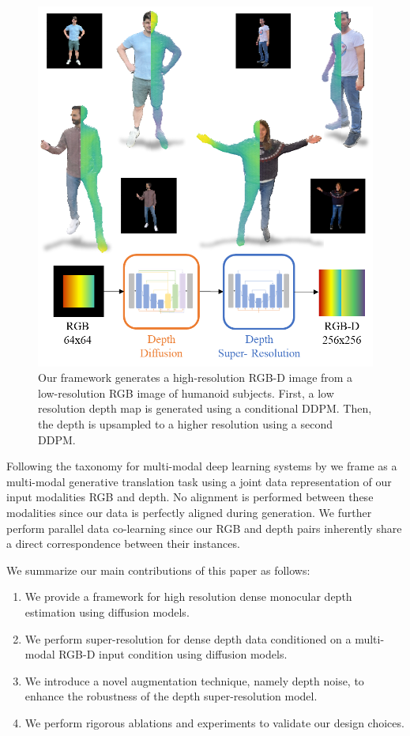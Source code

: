 \begin{figure}[t]
  \centering
  \includegraphics[width=0.99\linewidth]{illustrations/featured_image.png}
  \caption{Our \modelname{} framework generates a high-resolution RGB-D image from a low-resolution RGB image of humanoid subjects. First, a low resolution depth map is generated using a conditional DDPM. Then, the depth is upsampled to a higher resolution using a second DDPM.}
  \label{fig:featured_image}
\end{figure}

Following the taxonomy for multi-modal deep learning systems by \cite{zhan_multimodal_2022} we frame \modelname{} as a multi-modal generative translation task using a joint data representation of our input modalities RGB and depth. No alignment is performed between these modalities since our data is perfectly aligned during generation. We further perform parallel data co-learning since our RGB and depth pairs inherently share a direct correspondence between their instances.

We summarize our main contributions of this paper as follows:
\begin{enumerate}
  \item We provide a framework for high resolution dense monocular depth estimation using diffusion models.
  \item We perform super-resolution for dense depth data conditioned on a multi-modal RGB-D input condition using diffusion models. 
  \item We introduce a novel augmentation technique, namely depth noise, to enhance the robustness of the depth super-resolution model.
  \item We perform rigorous ablations and experiments to validate our design choices.
\end{enumerate}

